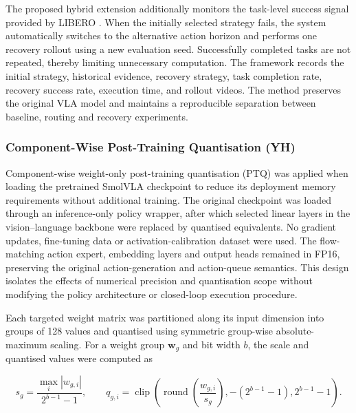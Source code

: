 The proposed hybrid extension additionally monitors the task-level
success signal provided by LIBERO \cite{libero}. When the
initially selected strategy fails, the system automatically switches to
the alternative action horizon and performs one recovery rollout using
a new evaluation seed. Successfully completed tasks are not repeated,
thereby limiting unnecessary computation. The framework records the
initial strategy, historical evidence, recovery strategy, task
completion rate, recovery success rate, execution time, and rollout
videos. The method preserves the original VLA model and maintains a
reproducible separation between baseline, routing and recovery experiments.

\subsubsection{Component-Wise Post-Training Quantisation (YH)}
Component-wise weight-only post-training quantisation (PTQ) was applied when loading the pretrained SmolVLA checkpoint to reduce its deployment memory requirements without additional training. The original checkpoint was loaded through an inference-only policy wrapper, after which selected linear layers in the vision--language backbone were replaced by quantised equivalents. No gradient updates, fine-tuning data or activation-calibration dataset were used. The flow-matching action expert, embedding layers and output heads remained in FP16, preserving the original action-generation and action-queue semantics. This design isolates the effects of numerical precision and quantisation scope without modifying the policy architecture or closed-loop execution procedure.

Each targeted weight matrix was partitioned along its input dimension into groups of 128 values and quantised using symmetric group-wise absolute-maximum scaling. For a weight group \(\mathbf{w}_g\) and bit width \(b\), the scale and quantised values were computed as

\begin{equation}
  s_g=\frac{\max_i |w_{g,i}|}{2^{b-1}-1},
  \qquad
  q_{g,i}=\operatorname{clip}\!\left(
    \operatorname{round}\!\left(\frac{w_{g,i}}{s_g}\right),
    -\left(2^{b-1}-1\right),
    2^{b-1}-1
  \right).
  \label{eq:groupwise_quantisation}
\end{equation}

